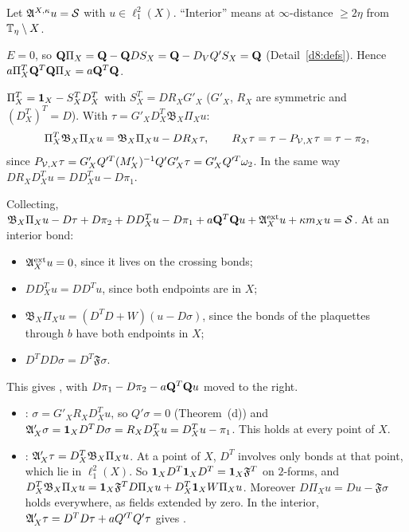 \begin{detail}\label{d8:localsys}
Let $\mathfrak A^{X,\kappa}u=\mathcal S$ with $u\in\ell^2_1(X)$. ``Interior'' means at $\infty$-distance $\ge2\eta$ from $\mathbb T_\eta\setminus X$.
\begin{step}
$E=0$, so $\mathbf Q\Pi_X=\mathbf Q-\mathbf Q DS_X=\mathbf Q-D_VQ'S_X=\mathbf Q$ (Detail~\ref{d8:defs}). Hence $a\Pi_X^T\mathbf Q^T\mathbf Q\Pi_X=a\mathbf Q^T\mathbf Q$.
\end{step}
\begin{step}
$\Pi_X^T=\mathbf 1_X-S_X^TD^T_X$ with $S_X^T=DR_XG'_X$ ($G'_X$, $R_X$ are symmetric and $(D^T_X)^T=D$). With $\tau=G'_XD^T_X\mathfrak B_X\Pi_Xu$:
\[
\Pi_X^T\mathfrak B_X\Pi_Xu=\mathfrak B_X\Pi_Xu-DR_X\tau,\qquad R_X\tau=\tau-P_{\mathcal V,X}\tau=\tau-\pi_2 ,
\]
since $P_{\mathcal V,X}\tau=G'_XQ'^T(M'_X)^{-1}Q'G'_X\tau=G'_XQ'^T\omega_2$. In the same way $DR_XD^T_Xu=DD^T_Xu-D\pi_1$.
\end{step}
\begin{step}[\Neqref{eq:Eu}]
Collecting, $\mathfrak B_X\Pi_Xu-D\tau+D\pi_2+DD^T_Xu-D\pi_1+a\mathbf Q^T\mathbf Q u+\mathfrak A^{\rm ext}_Xu+\kappa m_Xu=\mathcal S$. At an interior bond:
\begin{itemize}
\item $\mathfrak A^{\rm ext}_Xu=0$, since it lives on the crossing bonds;
\item $DD^T_Xu=DD^Tu$, since both endpoints are in $X$;
\item $\mathfrak B_X\Pi_Xu=(D^TD+W)(u-D\sigma)$, since the bonds of the plaquettes through $b$ have both endpoints in $X$;
\item $D^TDD\sigma=D^T\mathfrak F\sigma$.
\end{itemize}
This gives , with $D\pi_1-D\pi_2-a\mathbf Q^T\mathbf Q u$ moved to the right.
\end{step}
\begin{step}
\begin{itemize}
\item {}: $\sigma=G'_XR_XD^T_Xu$, so $Q'\sigma=0$ (Theorem~(d)) and $\mathfrak A'_X\sigma=\mathbf 1_XD^TD\sigma=R_XD^T_Xu=D^T_Xu-\pi_1$. This holds at every point of $X$.
\item {}: $\mathfrak A'_X\tau=D^T_X\mathfrak B_X\Pi_Xu$. At a point of $X$, $D^T$ involves only bonds at that point, which lie in $\ell^2_1(X)$. So $\mathbf 1_XD^T\mathbf 1_XD^T=\mathbf 1_X\mathfrak F^T$ on $2$-forms, and $D^T_X\mathfrak B_X\Pi_Xu=\mathbf 1_X\mathfrak F^TD\Pi_Xu+D^T_X\mathbf 1_XW\Pi_Xu$. Moreover $D\Pi_Xu=Du-\mathfrak F\sigma$ holds everywhere, as fields extended by zero. In the interior, $\mathfrak A'_X\tau=D^TD\tau+aQ'^TQ'\tau$ gives .

\end{itemize}
\end{step}
\end{detail}
